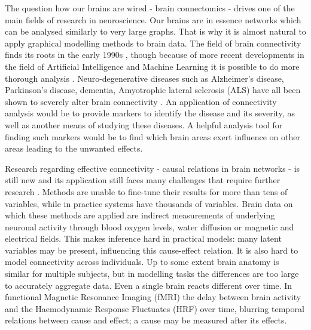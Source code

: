 \documentclass[a4paper, english]{article}
\begin{document}
The question how our brains are wired - brain connectomics - drives one of the main fields of research in neuroscience.
Our brains are in essence networks which can be analysed similarly to very large graphs.
That is why it is almost natural to apply graphical modelling methods to brain data.
The field of brain connectivity finds its roots in the early 1990s \cite{friston1993functional, friston1994}, though because of more recent developments in the field of Artificial Intelligence and Machine Learning it is possible to do more thorough analysis \cite{vandenheuvel2010}.
Neuro-degenerative diseases such as Alzheimer's disease, Parkinson's disease, dementia, Amyotrophic lateral sclerosis (ALS) have all been shown to severely alter brain connectivity \cite{Bullmore2009}.
An application of connectivity analysis would be to provide markers to identify the disease and its severity, as well as another means of studying these diseases.
A helpful analysis tool for finding such markers would be to find which brain areas exert influence on other areas leading  to the unwanted effects.

Research regarding effective connectivity - causal relations in brain networks - is still new and its application still faces many challenges that require further research \cite{ramsey2010}.
Methods are unable to fine-tune their results for more than tens of variables, while in practice systems have thousands of variables.
Brain data on which these methods are applied are indirect measurements of underlying neuronal activity through blood oxygen levels, water diffusion or magnetic and electrical fields.
This makes inference hard in practical models: many latent variables may be present, influencing this cause-effect relation.
It is also hard to model connectivity across individuals.
Up to some extent brain anatomy is similar for multiple subjects, but in modelling tasks the differences are too large to accurately aggregate data.
Even a single brain reacts different over time.
In functional Magnetic Resonance Imaging (fMRI) the delay between brain activity and the Haemodynamic Response Fluctuates (HRF) over time, blurring temporal relations between cause and effect; a cause may be measured after its effects.
\end{document}
